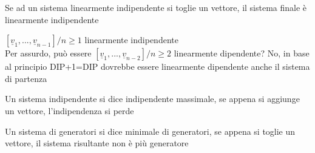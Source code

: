 \begin{nota}[INDIP-1=INDIP]
	Se ad un sistema linearmente indipendente si toglie un vettore, il sistema finale è linearmente indipendente
	\begin{dimostrazione}
		$[\underline{v}_1,...,\underline{v}_{n-1}]/n\geq 1$ linearmente indipendente\\
		Per assurdo, può essere $[\underline{v}_1,...,\underline{v}_{n-2}]/n\geq 2$ linearmente dipendente? No, in base al principio DIP+1=DIP dovrebbe essere linearmente dipendente anche il sistema di partenza
	\end{dimostrazione}
\end{nota}

\begin{nota}
	Un sistema indipendente si dice indipendente massimale, se appena si aggiunge un vettore, l'indipendenza si perde
\end{nota}

\begin{nota}
	Un sistema di generatori si dice minimale di generatori, se appena si toglie un vettore, il sistema risultante non è più generatore
\end{nota}


